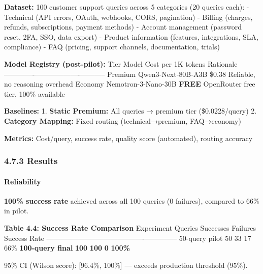 \documentclass[
]{article}
\begin{document}
\textbf{Dataset:} 100 customer support queries across 5 categories (20
queries each): - Technical (API errors, OAuth, webhooks, CORS,
pagination) - Billing (charges, refunds, subscriptions, payment methods)
- Account management (password reset, 2FA, SSO, data export) - Product
information (features, integrations, SLA, compliance) - FAQ (pricing,
support channels, documentation, trials)

\textbf{Model Registry (post-pilot):} \textbar{} Tier \textbar{} Model
\textbar{} Cost per 1K tokens \textbar{} Rationale \textbar{}
\textbar------\textbar-------\textbar-------------------\textbar-----------\textbar{}
\textbar{} Premium \textbar{} Qwen3-Next-80B-A3B \textbar{} \$0.38
\textbar{} Reliable, no reasoning overhead \textbar{} \textbar{} Economy
\textbar{} Nemotron-3-Nano-30B \textbar{} \textbf{FREE} \textbar{}
OpenRouter free tier, 100\% available \textbar{}

\textbf{Baselines:} 1. \textbf{Static Premium:} All queries → premium
tier (\$0.0228/query) 2. \textbf{Category Mapping:} Fixed routing
(technical→premium, FAQ→economy)

\textbf{Metrics:} Cost/query, success rate, quality score (automated),
routing accuracy

\hypertarget{results-2}{%
\subsubsection{4.7.3 Results}\label{results-2}}

\hypertarget{reliability}{%
\paragraph{Reliability}\label{reliability}}

\textbf{100\% success rate} achieved across all 100 queries (0
failures), compared to 66\% in pilot.

\textbf{Table 4.4: Success Rate Comparison} \textbar{} Experiment
\textbar{} Queries \textbar{} Successes \textbar{} Failures \textbar{}
Success Rate \textbar{}
\textbar------------\textbar---------\textbar-----------\textbar----------\textbar--------------\textbar{}
\textbar{} 50-query pilot \textbar{} 50 \textbar{} 33 \textbar{} 17
\textbar{} 66\% \textbar{} \textbar{} \textbf{100-query final}
\textbar{} \textbf{100} \textbar{} \textbf{100} \textbar{} \textbf{0}
\textbar{} \textbf{100\%} \textbar{}

95\% CI (Wilson score): {[}96.4\%, 100\%{]} --- exceeds production
threshold (95\%).
\end{document}
